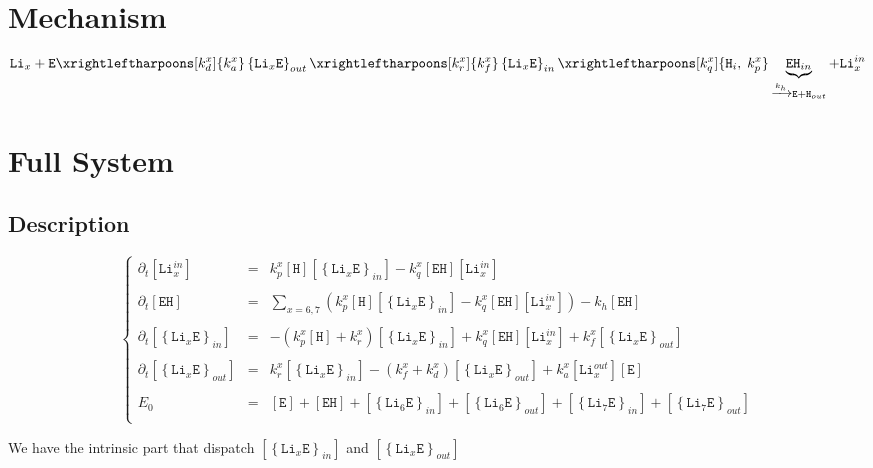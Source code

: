 \documentclass[aps,onecolumn,11pt]{revtex4}
\newcommand{\mychem}[1]{\mathtt{#1}}
\newcommand{\myconc}[1]{\left\lbrack{#1}\right\rbrack}
\newcommand{\LiEin}[1]{\myconc{\left\lbrace\mychem{Li}_{#1}\mychem{E}\right\rbrace_{in}}}
\newcommand{\LiEout}[1]{\myconc{\left\lbrace\mychem{Li}_{#1}\mychem{E}\right\rbrace_{out}}}
\newcommand{\LiIn}[1]{\myconc{\mychem{Li}_{#1}^{in}}}
\newcommand{\LiOut}[1]{\myconc{\mychem{Li}_{#1}^{out}}}
\newcommand{\EHin}{\myconc{\mychem{EH}}}
\newcommand{\Eout}{\myconc{\mychem{E}}}
\newcommand{\Hin}{\myconc{\mychem{H}}}
\begin{document}
\section{Mechanism}
\begin{equation}
	 \mychem{Li}_{x} +  \mychem{E}  
	 \xrightleftharpoons[k_d^x]{k_a^x} 
	 \left\lbrace\mychem{Li}_{x}\mychem{E}\right\rbrace_{out} 
	  \xrightleftharpoons[k_r^x]{k_f^x} 
	  \left\lbrace\mychem{Li}_{x}\mychem{E}\right\rbrace_{in}  
	  \xrightleftharpoons[k_q^x]{\mychem{H}_i,\;k_p^x} \underbrace{\mychem{EH}_{in}}_{\xrightarrow[]{k_h} \mychem{E} + \mychem{H}_{out}} + \mychem{Li}_{x}^{in}
\end{equation}

\section{Full System}
\subsection{Description}
\begin{equation}
\displaystyle
\left\lbrace
\begin{array}{rcl}
\partial_t\LiIn{x}   & = & k_p^x \Hin \LiEin{x} - k_q^x \EHin \LiIn{x} \\
\\
\partial_t \EHin     & = & \sum_{x=6,7}\left( k_p^x \Hin \LiEin{x} - k_q^x \EHin \LiIn{x}\right) - k_h \EHin \\
\\
\partial_t \LiEin{x} & = & -\left(k_p^x \Hin + k_r^x\right) \LiEin{x} + k_q^x \EHin \LiIn{x}
+ k_f^x \LiEout{x} \\
\\
\partial_t \LiEout{x} & = & k_r^x \LiEin{x} - (k_f^x+k_d^x) \LiEout{x} + k_a^x \LiOut{x} \Eout \\
\\
E_0 & = & \Eout + \EHin + \LiEin{6} + \LiEout{6} + \LiEin{7}+\LiEout{7}\\
\end{array}
\right.
\end{equation}

We have the intrinsic part that dispatch $\LiEin{x}$ and $\LiEout{x}$
\end{document}
